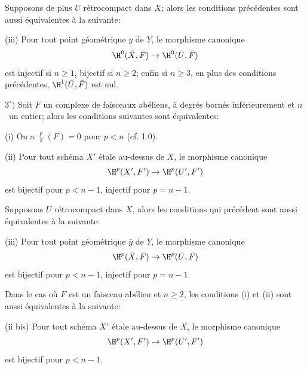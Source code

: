 \begin{proposition}
Supposons de plus $U$ r\'etrocompact dans $X$; alors les conditions pr\'ec\'edentes sont aussi \'equivalentes \`a la suivante:

\textup{(iii)} Pour tout point g\'eom\'etrique $\bar{y}$ de $Y$, le morphisme canonique
$$
\H^0(\bar{X}, \bar{F})\to \H^0(\bar{U}, \bar{F})
$$
est injectif si $n\geq 1$, bijectif si $n\geq 2$; enfin si $n\geq 3$, en plus des conditions pr\'ec\'edentes, $\H^1(\bar{U}, \bar{F})$ est nul.

$3^\circ)$ Soit $F$ un complexe de faisceaux ab\'eliens, \`a degr\'es born\'es inf\'erieurement et $n$~un entier; alors les conditions suivantes sont \'equivalentes:

\textup{(i)} On a ${\mathop{\underline{\mathrm{H}}}\nolimits}_Y^p(F)=0$ pour $p<n$ (cf. 1.0).

\textup{(ii)} Pour tout sch\'ema $X'$ \'etale au-dessus de $X$, le morphisme canonique
$$
\H^p(X', F')\to \H^p(U', F')
$$
est bijectif pour $p<n-1$, injectif pour $p=n-1$.

Supposons $U$ r\'etrocompact dans $X$, alors les conditions qui pr\'ec\'edent sont aussi \'equivalentes \`a la suivante:

\textup{(iii)} Pour tout point g\'eom\'etrique $\bar{y}$ de $Y$, le morphisme canonique
$$
\H^p(\bar{X}, \bar{F})\to \H^p(\bar{U}, \bar{F})$$
est bijectif pour $p<n-1$, injectif pour $p=n-1$.

Dans le cas o\`u $F$ est un faisceau ab\'elien et $n\geq 2$, les conditions \textup{(i)} et \textup{(ii)} sont aussi \'equivalentes \`a la suivante:

\textup{(ii bis)} Pour tout sch\'ema $X'$ \'etale au-dessus de $X$, le morphisme canonique
$$
\H^p(X', F')\to \H^p(U', F')$$
est bijectif pour $p<n-1$.
\end{proposition}

